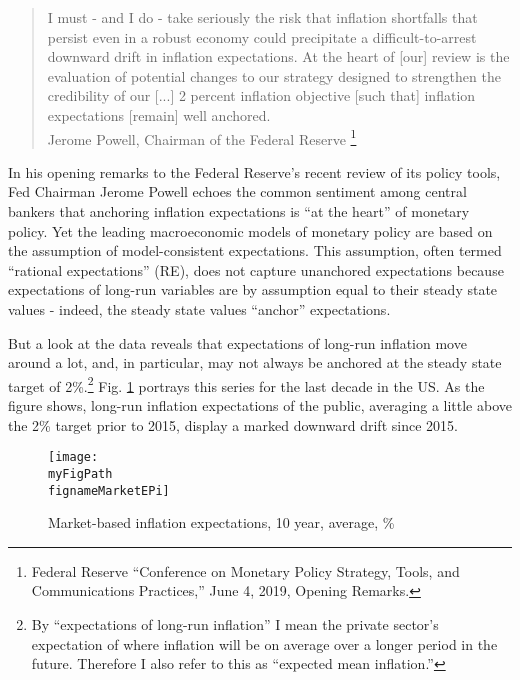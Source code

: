 \documentclass[11pt]{article}
\def \myFigPath {../../figures/}
\renewcommand{\[}{\begin{equation}}
\renewcommand{\]}{\end{equation}}
\def\mySmallFigScale{0.22}
\def\fignameMarketEPi{epi10_2020_06_04}
\begin{document}
\begin{quote}
I must - and I do - take seriously the risk that inflation shortfalls that persist even in a robust economy could precipitate a difficult-to-arrest downward drift in inflation expectations. At the heart of [our] review is the evaluation of potential changes to our strategy designed to strengthen the credibility of our [...] 2 percent inflation objective [such that] inflation expectations [remain] well anchored.\\
Jerome Powell, Chairman of the Federal Reserve \footnote{Federal Reserve ``Conference on Monetary Policy Strategy, Tools, and Communications Practices,''  June 4, 2019, Opening Remarks.}
\end{quote}

In his opening remarks to the Federal Reserve's recent review of its policy tools, Fed Chairman Jerome Powell echoes the common sentiment among central bankers that anchoring inflation expectations is ``at the heart'' of monetary policy. Yet the leading macroeconomic models of monetary policy are based on the assumption of model-consistent expectations. This assumption, often termed ``rational expectations'' (RE), does not capture unanchored expectations because expectations of long-run variables are by assumption equal to their steady state values - indeed, the steady state values ``anchor'' expectations. 

But a look at the data reveals that expectations of long-run inflation move around a lot, and, in particular, may not always be anchored at the steady state target of 2\%.\footnote{By ``expectations of long-run inflation'' I mean the private sector's expectation of where inflation will be on average over a longer period in the future. Therefore I also refer to this as ``expected mean inflation.''} Fig. \ref{epi} portrays this series for the last decade in the US. As the figure shows, long-run inflation expectations of the public, averaging a little above the 2\% target prior to 2015, display a marked downward drift since 2015. 

\begin{figure}[h!]
\texttt{[image: \\myFigPath \\fignameMarketEPi]}
\caption{Market-based inflation expectations, 10 year, average, \%}
\label{epi}
\end{figure}
\end{document}
